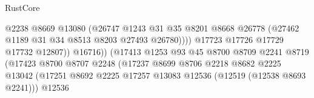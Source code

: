 \begin{lexlean}{RustCore}
\begin{coremodule}
                                                @2238
                                                @8669
                                                @13080
                                                (@26747
                                                  @1243
                                                  @31
                                                  @35
                                                  @8201
                                                  @8668
                                                  @26778
                                                  (@27462
                                                    @1189
                                                    @31
                                                    @34
                                                    @8513
                                                    @8203
                                                    @27493
                                                    @26780))))
                                            @17723
                                            @17726
                                            @17729
                                            @17732
                                            @12807))
                                        @16716))
                                    (@17413
                                      @1253
                                      @93
                                      @45
                                      @8700
                                      @8709
                                      @2241
                                      @8719
                                      (@17423
                                        @8700
                                        @8707
                                        @2248
                                        (@17237
                                          @8699
                                          @8706
                                          @2218
                                          @8682
                                          @2225
                                          @13042
                                          (@17251
                                            @8692
                                            @2225
                                            @17257
                                            @13083
                                            @12536
                                            (@12519 (@12538 @8693 @2241)))
                                          @12536

\end{coremodule}
\end{lexlean}
